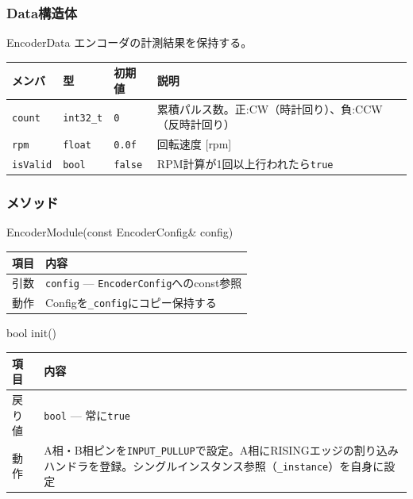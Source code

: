 \subsubsection{Data構造体}

\begin{funcblock}{EncoderData}
エンコーダの計測結果を保持する。

\begin{longtable}{l l l p{5.0cm}}
\toprule
\textbf{メンバ} & \textbf{型} & \textbf{初期値} & \textbf{説明} \\
\midrule
\endhead
\texttt{count}   & \texttt{int32\_t} & \texttt{0}     & 累積パルス数。正:CW（時計回り）、負:CCW（反時計回り） \\
\texttt{rpm}     & \texttt{float}    & \texttt{0.0f}  & 回転速度 [rpm] \\
\texttt{isValid} & \texttt{bool}     & \texttt{false} & RPM計算が1回以上行われたら\texttt{true} \\
\bottomrule
\end{longtable}
\end{funcblock}

\subsubsection{メソッド}

\begin{funcblock}{EncoderModule(const EncoderConfig\& config)}
\begin{tabularx}{\textwidth}{l X}
\toprule
\textbf{項目} & \textbf{内容} \\
\midrule
引数   & \texttt{config} --- \texttt{EncoderConfig}へのconst参照 \\
動作   & Configを\texttt{\_config}にコピー保持する \\
\bottomrule
\end{tabularx}
\end{funcblock}

\begin{funcblock}{bool init()}
\begin{tabularx}{\textwidth}{l X}
\toprule
\textbf{項目} & \textbf{内容} \\
\midrule
戻り値   & \texttt{bool} --- 常に\texttt{true} \\
動作     & A相・B相ピンを\texttt{INPUT\_PULLUP}で設定。A相にRISINGエッジの割り込みハンドラを登録。シングルインスタンス参照（\texttt{\_instance}）を自身に設定 \\
\bottomrule
\end{tabularx}
\end{funcblock}

